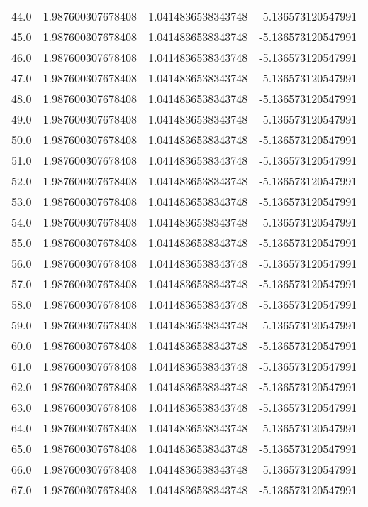\begin{longtable}{lrrr}
44.0 & 1.987600307678408 & 1.0414836538343748 & -5.136573120547991 \\
45.0 & 1.987600307678408 & 1.0414836538343748 & -5.136573120547991 \\
46.0 & 1.987600307678408 & 1.0414836538343748 & -5.136573120547991 \\
47.0 & 1.987600307678408 & 1.0414836538343748 & -5.136573120547991 \\
48.0 & 1.987600307678408 & 1.0414836538343748 & -5.136573120547991 \\
49.0 & 1.987600307678408 & 1.0414836538343748 & -5.136573120547991 \\
50.0 & 1.987600307678408 & 1.0414836538343748 & -5.136573120547991 \\
51.0 & 1.987600307678408 & 1.0414836538343748 & -5.136573120547991 \\
52.0 & 1.987600307678408 & 1.0414836538343748 & -5.136573120547991 \\
53.0 & 1.987600307678408 & 1.0414836538343748 & -5.136573120547991 \\
54.0 & 1.987600307678408 & 1.0414836538343748 & -5.136573120547991 \\
55.0 & 1.987600307678408 & 1.0414836538343748 & -5.136573120547991 \\
56.0 & 1.987600307678408 & 1.0414836538343748 & -5.136573120547991 \\
57.0 & 1.987600307678408 & 1.0414836538343748 & -5.136573120547991 \\
58.0 & 1.987600307678408 & 1.0414836538343748 & -5.136573120547991 \\
59.0 & 1.987600307678408 & 1.0414836538343748 & -5.136573120547991 \\
60.0 & 1.987600307678408 & 1.0414836538343748 & -5.136573120547991 \\
61.0 & 1.987600307678408 & 1.0414836538343748 & -5.136573120547991 \\
62.0 & 1.987600307678408 & 1.0414836538343748 & -5.136573120547991 \\
63.0 & 1.987600307678408 & 1.0414836538343748 & -5.136573120547991 \\
64.0 & 1.987600307678408 & 1.0414836538343748 & -5.136573120547991 \\
65.0 & 1.987600307678408 & 1.0414836538343748 & -5.136573120547991 \\
66.0 & 1.987600307678408 & 1.0414836538343748 & -5.136573120547991 \\
67.0 & 1.987600307678408 & 1.0414836538343748 & -5.136573120547991 \\

\end{longtable}
